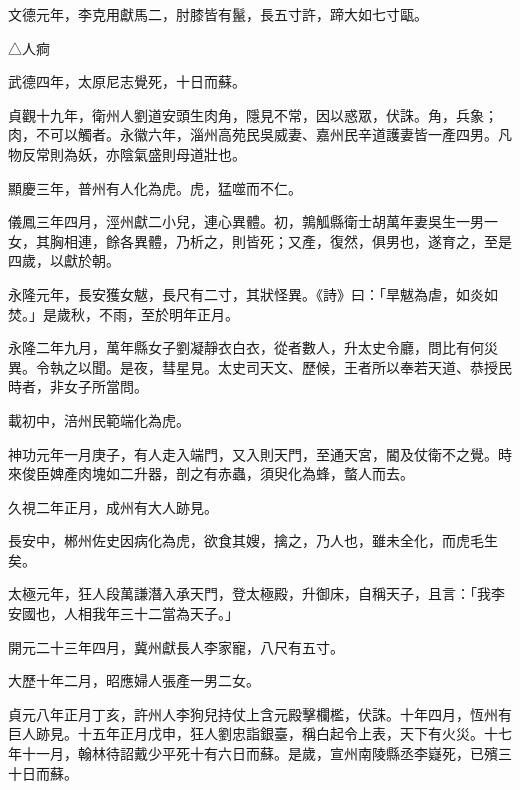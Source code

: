 \begin{pinyinscope}
 文德元年，李克用獻馬二，肘膝皆有鬣，長五寸許，蹄大如七寸甌。



 △人痾



 武德四年，太原尼志覺死，十日而蘇。



 貞觀十九年，衛州人劉道安頭生肉角，隱見不常，因以惑眾，伏誅。角，兵象；肉，不可以觸者。永徽六年，淄州高苑民吳威妻、嘉州民辛道護妻皆一產四男。凡物反常則為妖，亦陰氣盛則母道壯也。



 顯慶三年，普州有人化為虎。虎，猛噬而不仁。



 儀鳳三年四月，涇州獻二小兒，連心異體。初，鶉觚縣衛士胡萬年妻吳生一男一女，其胸相連，餘各異體，乃析之，則皆死；又產，復然，俱男也，遂育之，至是四歲，以獻於朝。



 永隆元年，長安獲女魃，長尺有二寸，其狀怪異。《詩》曰：「旱魃為虐，如炎如焚。」是歲秋，不雨，至於明年正月。



 永隆二年九月，萬年縣女子劉凝靜衣白衣，從者數人，升太史令廳，問比有何災異。令執之以聞。是夜，彗星見。太史司天文、歷候，王者所以奉若天道、恭授民時者，非女子所當問。



 載初中，涪州民範端化為虎。



 神功元年一月庚子，有人走入端門，又入則天門，至通天宮，閽及仗衛不之覺。時來俊臣婢產肉塊如二升器，剖之有赤蟲，須臾化為蜂，螫人而去。



 久視二年正月，成州有大人跡見。



 長安中，郴州佐史因病化為虎，欲食其嫂，擒之，乃人也，雖未全化，而虎毛生矣。



 太極元年，狂人段萬謙潛入承天門，登太極殿，升御床，自稱天子，且言：「我李安國也，人相我年三十二當為天子。」



 開元二十三年四月，冀州獻長人李家寵，八尺有五寸。



 大歷十年二月，昭應婦人張產一男二女。



 貞元八年正月丁亥，許州人李狗兒持仗上含元殿擊欄檻，伏誅。十年四月，恆州有巨人跡見。十五年正月戊申，狂人劉忠詣銀臺，稱白起令上表，天下有火災。十七年十一月，翰林待詔戴少平死十有六日而蘇。是歲，宣州南陵縣丞李嶷死，已殯三十日而蘇。




\end{pinyinscope}
